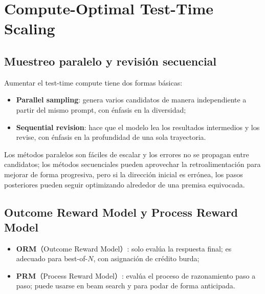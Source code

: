 \section{Compute-Optimal Test-Time Scaling}

\subsection{Muestreo paralelo y revisión secuencial}

Aumentar el test-time compute tiene dos formas básicas:

\begin{itemize}
    \item \textbf{Parallel sampling}: genera varios candidatos de manera independiente a partir del mismo prompt, con énfasis en la diversidad;
    \item \textbf{Sequential revision}: hace que el modelo lea los resultados intermedios y los revise, con énfasis en la profundidad de una sola trayectoria.
\end{itemize}


Los métodos paralelos son fáciles de escalar y los errores no se propagan entre candidatos; los métodos secuenciales pueden aprovechar la retroalimentación para mejorar de forma progresiva, pero si la dirección inicial es errónea, los pasos posteriores pueden seguir optimizando alrededor de una premisa equivocada.

\subsection{Outcome Reward Model y Process Reward Model}


\begin{itemize}
    \item \textbf{ORM}（Outcome Reward Model）: solo evalúa la respuesta final; es adecuado para best-of-$N$, con asignación de crédito burda;
    \item \textbf{PRM}（Process Reward Model）: evalúa el proceso de razonamiento paso a paso; puede usarse en beam search y para podar de forma anticipada.
\end{itemize}

